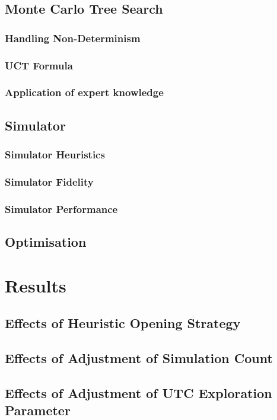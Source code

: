 \documentclass[]{article}
\let\oldsection\section
\renewcommand\section{\clearpage\oldsection}
\begin{document}
\subsection{Monte Carlo Tree Search}
\subsubsection{Handling Non-Determinism}
\subsubsection{UCT Formula}
\subsubsection{Application of expert knowledge}

\subsection{Simulator}
\subsubsection{Simulator Heuristics}
\subsubsection{Simulator Fidelity}
\subsubsection{Simulator Performance}

\subsection{Optimisation}

\section{Results}
\subsection{Effects of Heuristic Opening Strategy}
\subsection{Effects of Adjustment of Simulation Count}
\subsection{Effects of Adjustment of UTC Exploration Parameter}
\end{document}
